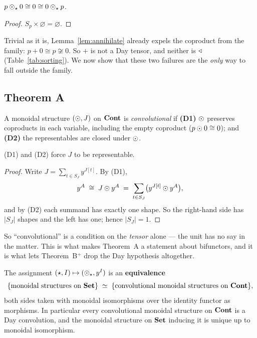 \begin{Lemma}\label{lem:annihilate}
$p\mathbin{\odot}_\star 0\cong 0\cong 0\mathbin{\odot}_\star p$.
\end{Lemma}

\begin{proof}
$S_p\times\varnothing=\varnothing$.
\end{proof}

Trivial as it is, Lemma~\ref{lem:annihilate} already expels the coproduct from
the family: $p+0\cong p\not\cong 0$. So $+$ is not a Day tensor, and neither is
$\mathbin{\triangleleft}$ (Table~\ref{tab:sorting}). We now show that these two failures are the
\emph{only} way to fall outside the family.

\subsection{Theorem A}

\begin{Definition}[Convolutional]\label{def:convolutional}
A monoidal structure $(\mathbin{\odot}, J)$ on $\mathbf{Cont}$ is \emph{convolutional} if
\textbf{(D1)} $\mathbin{\odot}$ preserves coproducts in each variable, including the empty
coproduct ($p\mathbin{\odot} 0\cong 0$); and \textbf{(D2)} the representables are closed
under $\mathbin{\odot}$.
\end{Definition}

\begin{Lemma}\label{lem:unitfree}
(D1) and (D2) force $J$ to be representable.
\end{Lemma}

\begin{proof}
Write $J=\sum_{t\in S_J} y^{J[t]}$. By (D1),
\[
  y^A \;\cong\; J\mathbin{\odot} y^A \;=\;\sum_{t\in S_J}\bigl(y^{J[t]}\mathbin{\odot} y^A\bigr),
\]
and by (D2) each summand has exactly one shape. So the right-hand side has
$|S_J|$ shapes and the left has one; hence $|S_J|=1$.
\end{proof}

So ``convolutional'' is a condition on the \emph{tensor} alone --- the unit has
no say in the matter. This is what makes Theorem~A a statement about
bifunctors, and it is what lets Theorem~B$^+$ drop the Day hypothesis
altogether.

\begin{Theorem}[A: classification]\label{thm:A}
The assignment $(\star,I)\mapsto(\mathbin{\odot}_\star, y^I)$ is an \textbf{equivalence}
\[
  \{\text{monoidal structures on }\mathbf{Set}\}\;\simeq\;
  \{\text{convolutional monoidal structures on }\mathbf{Cont}\},
\]
both sides taken with monoidal isomorphisms over the identity functor as
morphisms. In particular every convolutional monoidal structure on $\mathbf{Cont}$ is a
Day convolution, and the monoidal structure on $\mathbf{Set}$ inducing it is unique up
to monoidal isomorphism.
\end{Theorem}

